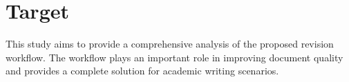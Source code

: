 \section{Target}
\label{sec:target}

This study aims to provide a comprehensive analysis of the proposed revision workflow. The workflow plays an important role in improving document quality and provides a complete solution for academic writing scenarios.
